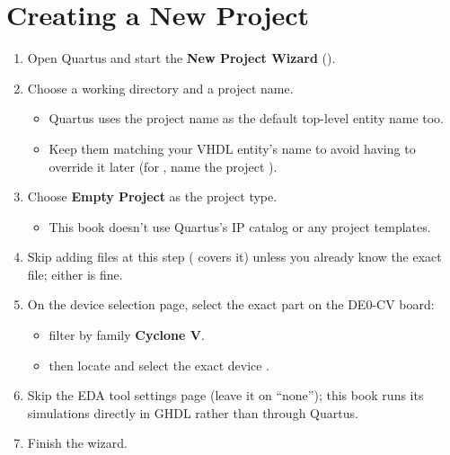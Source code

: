 \section{Creating a New Project}
\label{q:3}
\begin{enumerate}
  \item Open Quartus and start the \textbf{New Project Wizard}
    ().
  \item Choose a working directory and a project name.
  \begin{itemize}
    \item Quartus uses the project name as the default top-level entity name too.
    \item Keep them matching your VHDL entity's name to avoid having to override it later (for
      , name the project ).
  \end{itemize}
  \item Choose \textbf{Empty Project} as the project type.
  \begin{itemize}
    \item This book doesn't use Quartus's IP catalog or any project templates.
  \end{itemize}
  \item Skip adding files at this step ( covers it) unless you already know the exact
    file; either is fine.
  \item On the device selection page, select the exact part on the DE0-CV board:
  \begin{itemize}
    \item filter by family \textbf{Cyclone V}.
    \item then locate and select the exact device .
  \end{itemize}
  \item Skip the EDA tool settings page (leave it on ``none''); this book runs its simulations
    directly in GHDL rather than through Quartus.
  \item Finish the wizard.
\end{enumerate}

